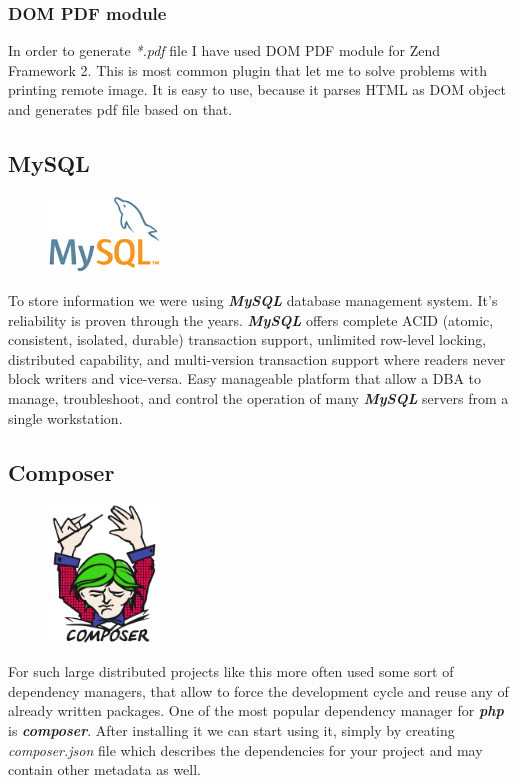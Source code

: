 			\subsubsection{DOM PDF module}
			In order to generate \textit{*.pdf} file I have used DOM PDF module for Zend Framework 2. This is most common plugin that let me to solve problems with printing remote image. It is easy to use, because it parses HTML as DOM object and generates pdf file based on that.~\cite{DOM_PDF_module}

    \subsection{MySQL}
\begin{figure}
	\includegraphics[width=3cm]{img/zf2/mysql-logo.png}
\end{figure} 
To store information we were using \textbf{\textit{MySQL}} database management system. It's reliability is proven through the years. \textbf{\textit{MySQL}} offers complete ACID (atomic, consistent, isolated, durable) transaction support, unlimited row-level locking, distributed capability, and multi-version transaction support where readers never block writers and vice-versa. Easy manageable platform that allow a DBA to manage, troubleshoot, and control the operation of many \textbf{\textit{MySQL}} servers from a single workstation. ~\cite{MySQL_Top10_Reasons}

    \subsection{Composer}
\begin{figure}
	\includegraphics[width=3cm]{img/zf2/composer-logo.png}
\end{figure} 
For such large distributed projects like this more often used some sort of dependency managers, that allow to force the development cycle and reuse any of already written packages. One of the most popular dependency manager for \textbf{\textit{php}} is \textbf{\textit{composer}}.
After installing it we can start using it, simply by creating \textit{composer.json} file which describes the dependencies for your project and may contain other metadata as well.~\cite{Composer_doc} 


